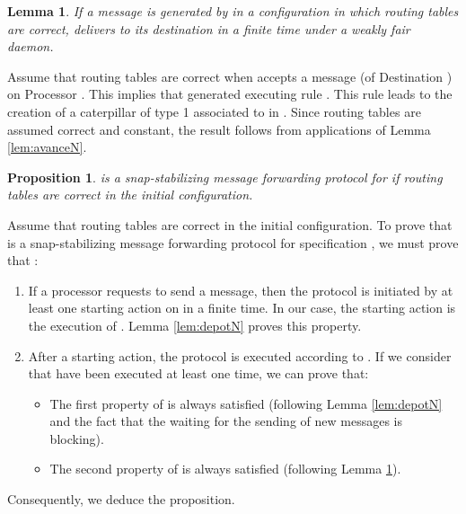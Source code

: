 \documentclass[11pt]{article}
\newtheorem{lemma}{Lemma}
\newtheorem{proposition}{Proposition}
\newenvironment{proof}{{\noindent\bf Proof. } }{{\hfill }}
\begin{document}
\begin{lemma} \label{lem:transportN}
If a message  is generated by \AN in a configuration in which routing tables are correct, \AN delivers  to its destination in a finite time under a weakly fair daemon.
\end{lemma}

\begin{proof}
Assume that routing tables are correct when \AN accepts a message  (of Destination ) on Processor . This implies that  generated  executing rule . This rule leads to the creation of a caterpillar of type 1 associated to  in . Since routing tables are assumed correct and constant, the result follows from  applications of Lemma \ref{lem:avanceN}.
\end{proof}

\begin{proposition} \label{prop:snapTRN}
\AN is a snap-stabilizing message forwarding protocol for  if routing tables are correct in the initial configuration.
\end{proposition}

\begin{proof}
Assume that routing tables are correct in the initial configuration. To prove that \AN is a snap-stabilizing message forwarding protocol for specification , we must prove that :

\begin{enumerate}
\item If a processor  requests to send a message, then the protocol is initiated by at least one starting action on  in a finite time. In our case, the starting action is the execution of . Lemma \ref{lem:depotN} proves this property. 
\item After a starting action, the protocol is executed according to . If we consider that  have been executed at least one time, we can prove that:

\begin{itemize}
\item The first property of  is always satisfied (following Lemma \ref{lem:depotN} and the fact that the waiting for the sending of new messages is blocking). 
\item The second property of  is always satisfied (following Lemma \ref{lem:transportN}). 
\end{itemize}

\end{enumerate}

Consequently, we deduce the proposition.
\end{proof}
\end{document}

